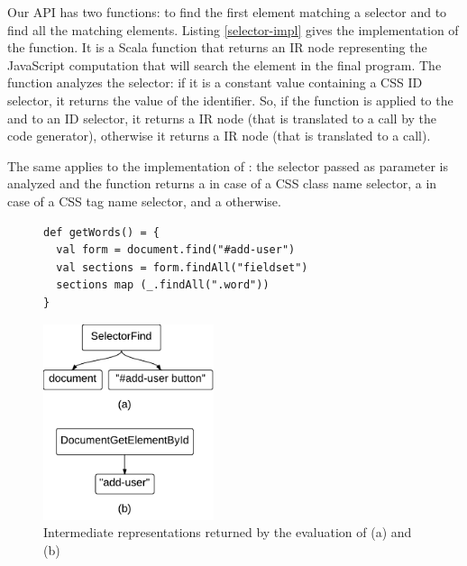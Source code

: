 \documentclass[preprint]{sigplanconf}
\begin{document}
Our API has two functions:  to find the first element matching a selector and
 to find all the matching elements. Listing \ref{selector-impl} gives the
implementation of the  function. It is a Scala function that returns an IR node
representing the JavaScript computation that will search the element in the final program. The
 function analyzes the selector: if it is a constant  value
containing a CSS ID selector, it returns the value of the identifier. So, if the 
function is applied to the  and to an ID selector, it returns a
 IR node (that is translated to a  call
by the code generator), otherwise it returns a  IR node (that is translated to a
 call).

The same applies to the implementation of : the selector passed as parameter is
analyzed and the function returns a  in case of a CSS class
name selector, a  in case of a CSS tag name selector, and a
 otherwise.

\begin{figure}[htb]
\begin{lstlisting}[label=js-scala-selectors,caption=Searching elements in js-scala]
def getWords() = {
  val form = document.find("#add-user")
  val sections = form.findAll("fieldset")
  sections map (_.findAll(".word"))
}
\end{lstlisting}
\end{figure}

\begin{figure}[htb]
\begin{center}
\includegraphics[width=5cm]{ir.pdf}
\end{center}
\caption{Intermediate representations returned by the evaluation of (a)
 and (b) }
\label{fig:ir}
\end{figure}
\end{document}
